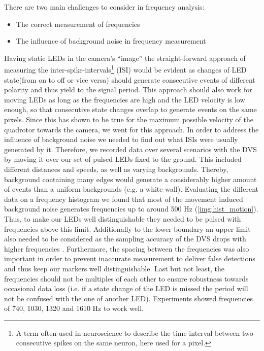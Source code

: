 There are two main challenges to consider in frequency analysis:
\begin{itemize}
\item The correct measurement of frequencies
\item The influence of background noise in frequency measurement
\end{itemize}

Having static LEDs in the camera's "`image"' the straight-forward approach of measuring the inter-spike-intervals\footnote{A term often used in neuroscience to describe the time interval between two consecutive spikes on the same neuron, here used for a pixel.} (ISI) would be evident as changes of LED state(from on to off or vice versa) should generate consecutive events of different polarity and thus yield to the signal period. This approach should also work for moving LEDs as long as the frequencies are high and the LED velocity is low enough, so that consecutive state changes overlap to generate events on the same pixels. Since this has shown to be true for the maximum possible velocity of the quadrotor towards the camera, we went for this approach.
In order to address the influence of background noise we needed to find out what ISIs were usually generated by it. Therefore, we recorded data over several scenarios with the DVS by moving it over our set of pulsed LEDs fixed to the ground. This included different distances and speeds, as well as varying backgrounds. Thereby, background containing many edges would generate a considerably higher amount of events than a uniform backgrounds (e.g. a white wall). Evaluating the different data on a frequency histogram we found that most of the movement induced background noise generates frequencies up to around 500 Hz (\ref{img:hist_motion}). Thus, to make our LEDs well distinguishable they needed to be pulsed with frequencies above this limit. Additionally to the lower boundary an upper limit also needed to be considered as the sampling accuracy of the DVS drops with higher frequencies \cite{Matthias}. Furthermore, the spacing between the frequencies was also important in order to prevent inaccurate measurement to deliver false detections and thus keep our markers well distinguishable. Last but not least, the frequencies should not be multiples of each other to ensure robustness towards occasional data loss (i.e. if a state change of the LED is missed the period will not be confused with the one of another LED). Experiments showed frequencies of 740, 1030, 1320 and 1610 Hz to work well.

